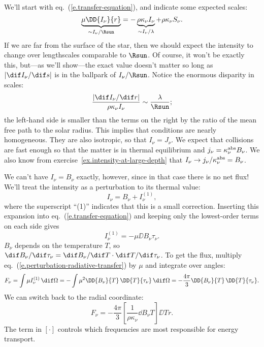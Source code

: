  We'll start with eq.~(\ref{e.transfer-equation}), and indicate some expected scales:
\[
\underbrace{\mu\DD{I_{\nu}}{r}}_{\sim I_{\nu}/\Rsun} = -\underbrace{\rho\kappa_{\nu} I_{\nu}}_{\sim I_{\nu}/\lambda}  +\rho\kappa_{\nu} S_{\nu}.
\]
If we are far from the surface of the star, then we should expect the intensity to change over lengthscales comparable to $\Rsun$. Of course, it won't be exactly this, but---as we'll show---the exact value doesn't matter so long as $|\dif I_{\nu}/\dif s|$ is in the ballpark of $I_{\nu}/\Rsun$. Notice the enormous disparity in scales:
\[
	\frac{|\dif I_{\nu}/\dif r|}{\rho\kappa_{\nu}I_{\nu}} \sim \frac{\lambda}{\Rsun};
\]
the left-hand side is smaller than the terms on the right by the ratio of the mean free path to the solar radius. This implies that conditions are nearly homogeneous. They are also isotropic, so that $I_{\nu} = J_{\nu}$. We expect that collisions are fast enough so that the matter is in thermal equilibrium and $j_{\nu} = \kappa_\nu^{\mathrm{abs}} B_{\nu}$. We also know from exercise~\ref{ex.intensity-at-large-depth} that $I_{\nu} \to j_{\nu}/\kappa_\nu^{\mathrm{abs}} = B_{\nu}$.

We can't have $I_{\nu} = B_{\nu}$ exactly, however, since in that case there is no net flux! We'll treat the intensity as a perturbation to its thermal value:
\[ I_{\nu} = B_{\nu} + I_{\nu}^{(1)}, \]
where the superscript ``(1)'' indicates that this is a small correction. Inserting this expansion into eq.~(\ref{e.transfer-equation}) and keeping only the lowest-order terms on each side gives
\begin{equation}\label{e.perturbation-radiative-transfer}
I_{\nu}^{(1)} = -\mu\DD{B_{\nu}}{\tau_{\nu}}.
\end{equation}
$B_{\nu}$ depends on the temperature $T$, so $\dif B_{\nu}/\dif\tau_{\nu} = \dif B_{\nu}/\dif T \cdot \dif T/\dif \tau_{\nu}$. To get the flux, multiply eq.~(\ref{e.perturbation-radiative-transfer}) by $\mu$ and integrate over angles:
\[ F_{\nu} = \int\mu I_{\nu}^{(1)}\,\dif\Omega = -\int \mu^{2}\DD{B_{\nu}}{T}\,\DD{T}{\tau_{\nu}}\,\dif \Omega = -\frac{4\pi}{3} \DD{B_{\nu}}{T}\,\DD{T}{\tau_{\nu}}. \]
We can switch back to the radial coordinate:
\begin{equation}\label{e.specific-radiative-transport}
	F_{\nu} = -\frac{4\pi}{3}\left[\frac{1}{\rho\kappa_{\nu}}\dd{B_{\nu}}{T}\right]\DD{T}{r}.
\end{equation}
The term in $\left[\cdot\right]$ controls which frequencies are most responsible for energy transport.

